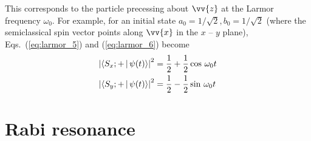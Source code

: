 %
This corresponds to the particle precessing about $\vv{z}$ at the Larmor frequency $\omega_0$. For example, for an initial state $a_0=1/\sqrt{2}, b_0=1/\sqrt{2}$ (where the semiclassical spin vector points along $\vv{x}$ in the $x \text{ -- } y$ plane), Eqs.~(\ref{eq:larmor_5}) and (\ref{eq:larmor_6}) become
%
\begin{align}
    \left| \Braket{S_x;+ | \psi(t)} \right|^2&= \frac{1}{2} + \frac{1}{2}\cos\,\omega_0t \\
    \left| \Braket{S_y;+ | \psi(t)} \right|^2&= \frac{1}{2} - \frac{1}{2}\sin\,\omega_0t 
\end{align}


\section{Rabi resonance\label{sec:rabi}}


